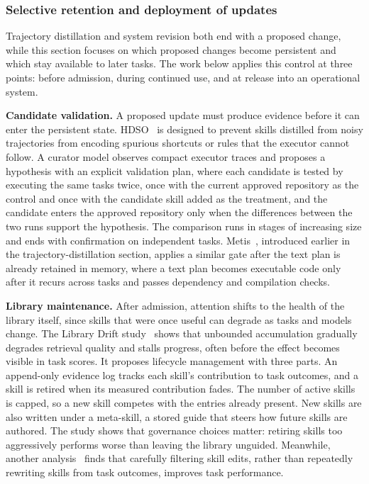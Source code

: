 \subsubsection{Selective retention and deployment of updates}

Trajectory distillation and system revision both end with a proposed change, while this section focuses on which proposed changes become persistent and which stay available to later tasks. The work below applies this control at three points: before admission, during continued use, and at release into an operational system.

\noindent\textbf{Candidate validation.} A proposed update must produce evidence before it can enter the persistent state. HDSO~\cite{shang2026hypothesis} is designed to prevent skills distilled from noisy trajectories from encoding spurious shortcuts or rules that the executor cannot follow. A curator model observes compact executor traces and proposes a hypothesis with an explicit validation plan, where each candidate is tested by executing the same tasks twice, once with the current approved repository as the control and once with the candidate skill added as the treatment, and the candidate enters the approved repository only when the differences between the two runs support the hypothesis. The comparison runs in stages of increasing size and ends with confirmation on independent tasks. Metis~\cite{dai2026metis}, introduced earlier in the trajectory-distillation section, applies a similar gate after the text plan is already retained in memory, where a text plan becomes executable code only after it recurs across tasks and passes dependency and compilation checks.

\noindent\textbf{Library maintenance.} After admission, attention shifts to the health of the library itself, since skills that were once useful can degrade as tasks and models change. The Library Drift study~\cite{zhang2026library} shows that unbounded accumulation gradually degrades retrieval quality and stalls progress, often before the effect becomes visible in task scores. It proposes lifecycle management with three parts. An append-only evidence log tracks each skill's contribution to task outcomes, and a skill is retired when its measured contribution fades. The number of active skills is capped, so a new skill competes with the entries already present. New skills are also written under a meta-skill, a stored guide that steers how future skills are authored. The study shows that governance choices matter: retiring skills too aggressively performs worse than leaving the library unguided. Meanwhile, another analysis~\cite{liu2026rethinking} finds that carefully filtering skill edits, rather than repeatedly rewriting skills from task outcomes, improves task performance.

